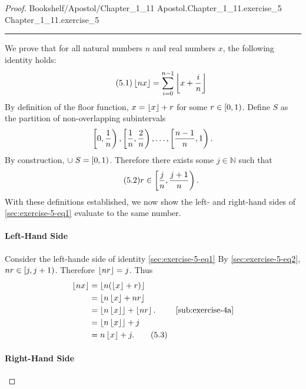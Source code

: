 \documentclass{article}
\newcommand{\link}[1]{\lean{../..}
  {Bookshelf/Apostol/Chapter\_1\_11}
  {Apostol.Chapter\_1\_11.#1}
  {Chapter\_1\_11.#1}
}
\begin{document}
\begin{proof}

  \link{exercise\_5}

  \vspace{6pt}
  \hrule
  \vspace{6pt}

  We prove that for all natural numbers $n$ and real numbers $x$, the following
    identity holds:
    \begin{equation}
      \label{sec:exercise-5-eq1}
      \tag{5.1}
      \left\lfloor nx\right\rfloor = \sum_{i=0}^{n-1} \left\lfloor x + \frac{i}{n}\right\rfloor
    \end{equation}
  By definition of the floor function, $x = \left\lfloor x\right\rfloor + r$ for some
    $r \in \left[0, 1\right)$.
  Define $S$ as the partition of non-overlapping subintervals
    $$\left[0, \frac{1}{n}\right), \left[\frac{1}{n}, \frac{2}{n}\right), \ldots,
      \left[\frac{n-1}{n}, 1\right).$$
  By construction, $\cup\; S = \left[0, 1\right)$.
  Therefore there exists some $j \in \mathbb{N}$ such that
    \begin{equation}
      \label{sec:exercise-5-eq2}
      \tag{5.2}
      r \in \left[\frac{j}{n}, \frac{j+1}{n}\right).
    \end{equation}
  With these definitions established, we now show the left- and right-hand sides
    of \eqref{sec:exercise-5-eq1} evaluate to the same number.

  \paragraph{Left-Hand Side}%

    Consider the left-hande side of identity \eqref{sec:exercise-5-eq1}
    By \eqref{sec:exercise-5-eq2}, $nr \in \left[j, j + 1\right)$.
    Therefore $\left\lfloor nr\right\rfloor = j$.
    Thus
      \begin{align*}
        \left\lfloor nx\right\rfloor
          & = \left\lfloor n(\left\lfloor x\right\rfloor + r)\right\rfloor \nonumber \\
          & = \left\lfloor n\left\lfloor x\right\rfloor + nr\right\rfloor \nonumber \\
          & = \left\lfloor n\left\lfloor x\right\rfloor\right\rfloor + \left\lfloor nr\right\rfloor. \nonumber
            & \eqref{sub:exercise-4a} \\
          & = \left\lfloor n\left\lfloor x\right\rfloor\right\rfloor + j \nonumber \\
          & = n\left\lfloor x\right\rfloor + j. \label{sec:exercise-5-eq3} \tag{5.3}
      \end{align*}

  \paragraph{Right-Hand Side}%


\end{proof}
\end{document}
